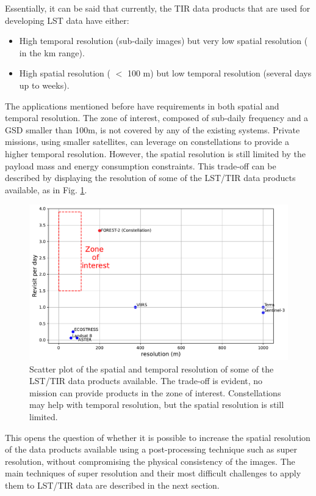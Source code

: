         Essentially, it can be said that currently, the TIR data products that are used for developing LST data have either: 
        
        \begin{itemize}
            \item High temporal resolution (sub-daily images) but very low spatial resolution ( in the km range).
            \item High spatial resolution ( $<$ 100 m) but low temporal resolution (several days up to weeks).
        \end{itemize}

        The applications mentioned before have requirements in both spatial and temporal resolution. 
        The zone of interest, composed of sub-daily frequency and a GSD smaller than 100m, is not covered by any of the existing systems.
        Private missions, using smaller satellites, can leverage on constellations  to provide a higher temporal resolution.
        However, the spatial resolution is still limited by the payload mass and energy consumption constraints.
        This trade-off can be described by displaying the resolution of some of the LST/TIR data products available, as in Fig. \ref{fig:1-spatio-temporal-trade-off}. 

        \begin{figure}[H]
            \centering
            \includegraphics[width=\textwidth]{Includes/2-scatterplot-res-revisit.pdf}
            \caption{Scatter plot of the spatial and temporal resolution of some of the LST/TIR data products available.
                     The trade-off is evident, no mission can provide products in the zone of interest.
                     Constellations may help with temporal resolution, but the spatial resolution is still limited.}
            \label{fig:1-spatio-temporal-trade-off}
        \end{figure}

        This opens the question of whether it is possible to increase the spatial resolution of the data products available using a post-processing technique such as super resolution, without compromising the physical consistency of the images.
        The main techniques of super resolution and their most difficult challenges to apply them to LST/TIR data are described in the next section.

\newpage